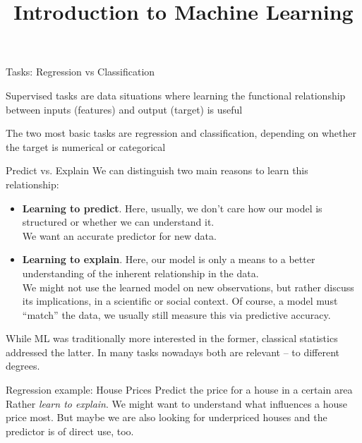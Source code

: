 \documentclass[11pt,compress,t,notes=noshow, xcolor=table]{beamer}
\title{Introduction to Machine Learning}
\begin{document}


\begin{framei}{Tasks: Regression vs Classification}
\item Supervised tasks are data situations where learning the functional relationship between inputs (features) and output (target) is useful
\item The two most basic tasks are regression and classification, depending on whether the target is numerical or categorical
\vfill
{}
\end{framei}


\begin{frame2}{Predict vs. Explain}
We can distinguish two main reasons to learn this relationship:
\begin{itemize}
\item \textbf{Learning to predict}. Here, usually, we don't care how our model is structured or whether we can understand it.\\
We want an accurate predictor for new data.
\item \textbf{Learning to explain}. Here, our model is only a means to a better understanding of the inherent relationship in the data.\\
We might not use the learned model on new observations, but rather discuss its implications, in a scientific or social context.
Of course, a model must ``match'' the data, we usually still measure this via predictive accuracy. 
\end{itemize}  
\vfill
While ML was traditionally more interested in the former, classical statistics addressed the latter.
In many tasks nowadays both are relevant -- to different degrees.
\end{frame2}


\begin{frame2}{Regression example: House Prices}
Predict the price for a house in a certain area
\vfill
{} %
\vfill
{}
\vfill
Rather \textit{learn to explain}. We might want to understand what influences a house price most.
But maybe we are also looking for underpriced houses and the predictor is of direct use, too.
\end{frame2}
\end{document}
